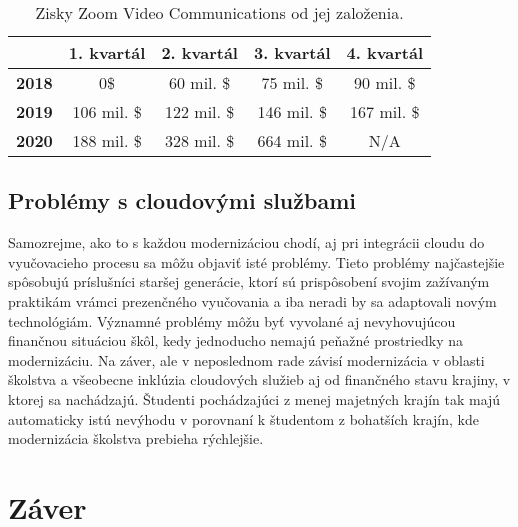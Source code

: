 \documentclass[10pt,slovak,a4paper]{article}%
\begin{document}
\begin{table}[h]
\centering
\begin{tabular}{|l|c|c|c|c|}
\hline
              & \multicolumn{1}{l|}{\textbf{1. kvartál}} & \multicolumn{1}{l|}{\textbf{2. kvartál}} & \multicolumn{1}{l|}{\textbf{3. kvartál}} & \multicolumn{1}{l|}{\textbf{4. kvartál}} \\ \hline
\textbf{2018} & 0\$                                      & 60 mil. \$                               & 75 mil. \$                               & 90 mil. \$                               \\ \hline
\textbf{2019} & 106 mil. \$                              & 122 mil. \$                              & 146 mil. \$                              & 167 mil. \$                              \\ \hline
\textbf{2020} & \cellcolor[HTML]{FFCCC9}188 mil. \$      & \cellcolor[HTML]{FFCCC9}328 mil. \$      & \cellcolor[HTML]{FFCCC9}664 mil. \$      & N/A                                      \\ \hline
\end{tabular}
\caption{Zisky Zoom Video Communications od jej založenia.}
\end{table}


\subsection{Problémy s cloudovými službami}

Samozrejme, ako to s každou modernizáciou chodí, aj pri integrácii cloudu do vyučovacieho procesu sa môžu objaviť isté problémy. Tieto problémy najčastejšie spôsobujú príslušníci staršej generácie, ktorí sú prispôsobení svojim zažívaným praktikám vrámci prezenčného vyučovania a iba neradi by sa adaptovali novým technológiám. Významné problémy môžu byť vyvolané aj nevyhovujúcou finančnou situáciou škôl, kedy jednoducho nemajú peňažné prostriedky na modernizáciu. Na záver, ale v neposlednom rade závisí modernizácia v oblasti školstva a všeobecne inklúzia cloudových služieb aj od finančného stavu krajiny, v ktorej sa nachádzajú. Študenti pochádzajúci z menej majetných krajín tak majú automaticky istú nevýhodu v porovnaní k študentom z bohatších krajín, kde modernizácia školstva prebieha rýchlejšie.


\section{Záver}
\end{document}
